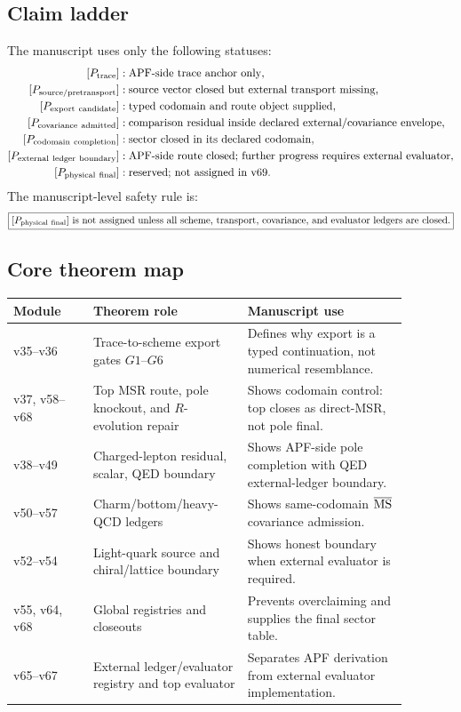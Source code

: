 \subsection{Claim ladder}
The manuscript uses only the following statuses:
\[
\begin{aligned}
[P_{\rm trace}]&: \text{APF-side trace anchor only},\\
[P_{\rm source/pretransport}]&: \text{source vector closed but external transport missing},\\
[P_{\rm export\ candidate}]&: \text{typed codomain and route object supplied},\\
[P_{\rm covariance\ admitted}]&: \text{comparison residual inside declared external/covariance envelope},\\
[P_{\rm codomain\ completion}]&: \text{sector closed in its declared codomain},\\
[P_{\rm external\ ledger\ boundary}]&: \text{APF-side route closed; further progress requires external evaluator},\\
[P_{\rm physical\ final}]&: \text{reserved; not assigned in v69}.
\end{aligned}
\]
The manuscript-level safety rule is:
\[
  \boxed{[P_{\rm physical\ final}]\ \text{is not assigned unless all scheme, transport, covariance, and evaluator ledgers are closed.}}
\]

\subsection{Core theorem map}
\begin{center}
\begin{tabular}{p{0.18\linewidth} p{0.34\linewidth} p{0.36\linewidth}}
\hline
Module & Theorem role & Manuscript use \\
\hline
v35--v36 & Trace-to-scheme export gates $G1$--$G6$ & Defines why export is a typed continuation, not numerical resemblance. \\
v37, v58--v68 & Top MSR route, pole knockout, and $R$-evolution repair & Shows codomain control: top closes as direct-MSR, not pole final. \\
v38--v49 & Charged-lepton residual, scalar, QED boundary & Shows APF-side pole completion with QED external-ledger boundary. \\
v50--v57 & Charm/bottom/heavy-QCD ledgers & Shows same-codomain $\overline{\rm MS}$ covariance admission. \\
v52--v54 & Light-quark source and chiral/lattice boundary & Shows honest boundary when external evaluator is required. \\
v55, v64, v68 & Global registries and closeouts & Prevents overclaiming and supplies the final sector table. \\
v65--v67 & External ledger/evaluator registry and top evaluator & Separates APF derivation from external evaluator implementation. \\
\hline
\end{tabular}
\end{center}


